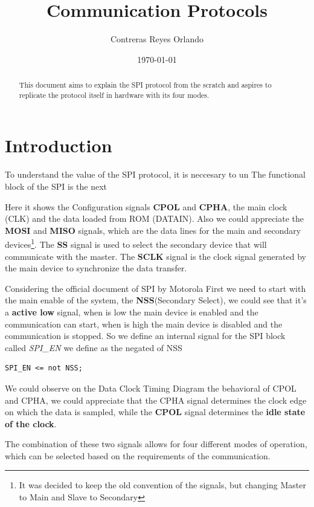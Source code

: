\documentclass[12pt]{article}
\title{Communication Protocols}
\author{Contreras Reyes Orlando}
\date{\today}
\begin{document}
\maketitle
\begin{abstract}
This document aims to explain the SPI protocol from the scratch and aspires to replicate the protocol itself in hardware with its four modes.
\end{abstract}

\section{Introduction}
To understand the value of the SPI protocol, it is neccesary to un
\newpage
\tableofcontents
\newpage
The functional block of the SPI is the next

Here it shows the Configuration signals \textbf{CPOL} and \textbf{CPHA}, the main clock (CLK) and the data loaded from ROM (DATAIN). 
Also we could appreciate the \textbf{MOSI} and \textbf{MISO} signals, which are the data lines for the main and secondary devices\footnote{It was decided to keep the old convention of the signals, but changing Master to Main and Slave to Secondary}. The \textbf{SS} signal is used to select the secondary device that will communicate with the master. The \textbf{SCLK} signal is the clock signal generated by the main device to synchronize the data transfer.

Considering the official document of SPI by Motorola
First we need to start with the main enable of the system, the \textbf{NSS}(Secondary Select), we could see that it's a \textbf{active low} signal, when is low the main device is enabled and the communication can start, when is high the main device is disabled and the communication is stopped. So we define an internal signal for the SPI block called \textit{SPI\_EN} we define as the negated of NSS
\begin{verbatim}
SPI_EN <= not NSS;
\end{verbatim}

We could observe on the Data Clock Timing Diagram the behavioral of CPOL and CPHA, we could appreciate that the CPHA signal determines the clock edge on which the data is sampled, while the \textbf{CPOL} signal determines the \textbf{idle state of the clock}. 

The combination of these two signals allows for four different modes of operation, which can be selected based on the requirements of the communication.
\end{document}
